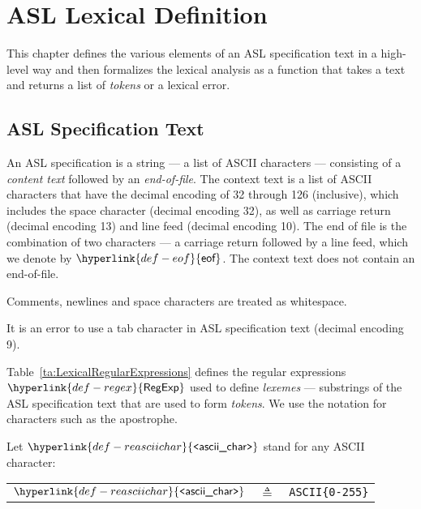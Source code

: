 \documentclass{book}
\newcommand\eof[0]{\hyperlink{def-eof}{\textsf{eof}}}
\newcommand\Char[1]{\fbox{#1}}
\newcommand\REasciichar[0]{\hyperlink{def-reasciichar}{\texttt{<}\textsf{ascii\_char}\texttt{>}}}
\newcommand\RegExp[0]{\hyperlink{def-regex}{\textsf{RegExp}}}
\begin{document}
\chapter{ASL Lexical Definition \label{chap:lexicalanalysis}}
This chapter defines the various elements of an ASL specification text in a high-level way
and then formalizes the lexical analysis as a function that takes a text and returns
a list of \emph{tokens} or a lexical error.

\section{ASL Specification Text}
An ASL specification is a string --- a list of ASCII characters --- consisting of a \emph{content text} followed by an \emph{end-of-file}.
The context text is a list of
ASCII characters that have the decimal encoding of 32 through 126 (inclusive),
which includes the space character (decimal encoding 32),
as well as
carriage return (decimal encoding 13) and line feed (decimal encoding 10).
\hypertarget{def-eof}{}
The end of file is the combination of two characters --- a carriage return followed by a line feed,
which we denote by $\eof$.
The context text does not contain an end-of-file.

Comments, newlines and space characters are treated as whitespace.

It is an error to use a tab character in ASL specification text (decimal encoding 9).

\hypertarget{def-regex}{}
Table~\ref{ta:LexicalRegularExpressions} defines the regular expressions $\RegExp$ used to define
\emph{lexemes} --- substrings of the ASL specification text that are used to form \emph{tokens}.
We use the notation \Char{c} for characters such as the apostrophe.

\hypertarget{def-reasciichar}{}
Let $\REasciichar$ stand for any ASCII character:
\begin{center}
\begin{tabular}{rcl}
$\REasciichar$  &$\triangleq$& \texttt{ASCII\{0-255\}}
\end{tabular}
\end{center}
\end{document}
